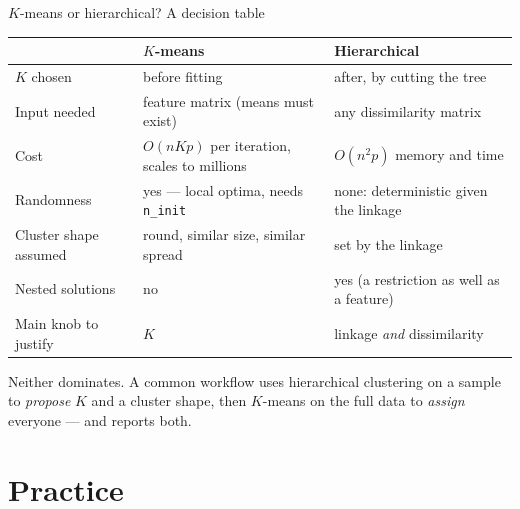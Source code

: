 \documentclass[aspectratio=169,11pt]{beamer}
\begin{document}
\begin{frame}{$K$-means or hierarchical? A decision table}
  \begin{center}\footnotesize
  \begin{tabular}{@{}p{3.5cm}p{4.6cm}p{4.6cm}@{}}
    \toprule
     & \textbf{$K$-means} & \textbf{Hierarchical} \\
    \midrule
    $K$ chosen            & before fitting & after, by cutting the tree \\
    Input needed          & feature matrix (means must exist) & any dissimilarity matrix \\
    Cost                  & $O(nKp)$ per iteration, scales to millions & $O(n^2p)$ memory and time \\
    Randomness            & yes --- local optima, needs \texttt{n\_init} & none: deterministic given the linkage \\
    Cluster shape assumed & round, similar size, similar spread & set by the linkage \\
    Nested solutions      & no & yes (a restriction as well as a feature) \\
    Main knob to justify   & $K$ & linkage \emph{and} dissimilarity \\
    \bottomrule
  \end{tabular}
  \end{center}
  \begin{takeaway}
    Neither dominates. A common workflow uses hierarchical clustering on a sample to
    \emph{propose} $K$ and a cluster shape, then $K$-means on the full data to
    \emph{assign} everyone --- and reports both.
  \end{takeaway}
\end{frame}

\section{Practice}
\end{document}
